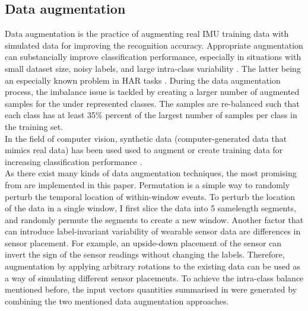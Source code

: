 \subsection{Data augmentation}
\label{sec:data_augmentation}
Data augmentation is the practice of augmenting real IMU training data with simulated data for improving the recognition accuracy. Appropriate augmentation can substancially improve classification performance, especially in situations with small dataset size, noisy labels, and large \mbox{intra-class} variability \cite{terry-2017}. The latter being an especially known problem in HAR tasks \cite{Andreas-2014}. During the data augmentation process, the imbalance issue is tackled by creating a larger number of augmented samples for the under represented classes. The samples are \mbox{re-balanced} such that each class has at least 35\% percent of the largest number of samples per class in the training set.\\
In the field of computer vision, synthetic data (\mbox{computer-generated} data that mimics real data) has been used used to augment or create training data for increasing classification performance \cite{xi-2015}.\\
As there exist many kinds of data augmentation techniques, the most promising from \cite{terry-2017} are implemented in this paper. Permutation is a simple way to randomly perturb the temporal location of \mbox{within-window} events. To perturb the location of the data in a single window, I first slice the data into 5 samelength segments, and randomly permute the segments to create a new window. Another factor that can introduce \mbox{label-invariant} variability of wearable sensor data are differences in sensor placement. For example, an \mbox{upside-down} placement of the sensor can invert the sign of the sensor readings without changing the labels. Therefore, augmentation by applying arbitrary rotations to the existing data can be used as a way of simulating different sensor placements. To achieve the \mbox{intra-class} balance mentioned before, the input vectors quantities summarised in  were generated by combining the two mentioned data augmentation approaches.

